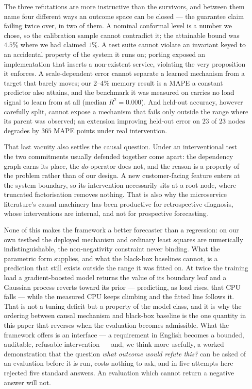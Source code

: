 \documentclass[journal, 10pt]{IEEEtran}
\begin{document}
The three refutations are more instructive than the survivors, and between them
name four different ways an outcome space can be closed --- the guarantee claim
failing twice over, in two of them. A nominal conformal level is a
number we chose, so the calibration sample cannot contradict it; the attainable
bound was $4.5\%$ where we had claimed $1\%$. A test suite cannot violate an
invariant keyed to an accidental property of the system it runs on; porting
exposed an implementation that inserts a non-existent service, violating the very
proposition it enforces. A scale-dependent error cannot separate a learned
mechanism from a target that barely moves; our $2$--$4\%$ memory result is a MAPE
a constant predictor also attains, and the benchmark it was measured on carries
no load signal to learn from at all (median $R^2 = 0.000$). And held-out accuracy,
however carefully split, cannot expose a mechanism that fails only outside the
range where its parent was observed; an extension improving held-out error on
$23$ of $23$ nodes degrades by $365$ MAPE points under real intervention.

That last vacuity also settles the causal question. Under an interventional test
the two commitments usually defended together come apart: the dependency graph
earns its place, the $do$-operator does not, and the reason is a property of the
problem rather than of our design. A new customer-facing feature enters at the
system boundary, so its intervention necessarily sits at a root node, where
truncated factorisation removes nothing. That is also why the microservice
literature's causal machinery has been productive for retrospective diagnosis,
whose interventions are internal, and not for prospective forecasting.

None of this makes the framework a better forecaster than a regression: on our
own testbed the deployed mechanism and ordinary least squares are numerically
indistinguishable, the non-negativity constraint never binding. What the
parametric form supplies, and what the black-box baselines cannot, is a
prediction that still exists outside the range it was fitted on. At twice the
training load a gradient-boosted model returns the value of its boundary leaf
and a Gaussian process reverts toward its prior --- predicting, as load rises,
that CPU falls --- while the measured CPU keeps climbing and the fitted line
follows it. That is not a tuning deficit but a property of the model class, and
it is why the ordering between causal mechanism and black-box baseline is the
one quantity in this paper that reverses when the evaluation becomes admissible.
What the framework offers is an interface --- a requirement in English becomes a
bounded, auditable,
refusable intervention --- and, we think more usefully, a worked demonstration
that the question \emph{what outcome would refute this?} can be asked of an
evaluation before it is run, costs nothing to ask, and in five attempts here
rejected five standard answers. An evaluation which cannot return a negative
answer will not.
\end{document}
